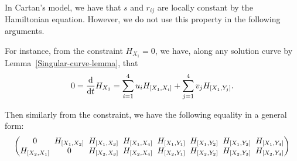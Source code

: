 \documentclass[11pt]{article}
\numberwithin{equation}{section}
\numberwithin{equation}{section}
\theoremstyle{definition}
\newcommand{\0}{\boldsymbol{0}}
\begin{document}
\begin{Remark}
In Cartan's model, we have that $s$ and $r_{ij}$ are locally constant by the Hamiltonian equation.
However, we do not use this property in the following arguments.
\end{Remark}

For instance, from the constraint $H_{X_1} = 0$, we have, along any solution curve
by Lemma~\ref{Singular-curve-lemma}, that
\[
0 = \frac{{\rm d}}{{\rm d}t}H_{X_1} = \sum_{i=1}^4 u_iH_{[X_1, X_i]} + \sum_{j=1}^4 v_jH_{[X_1, Y_j]}.
\]

Then similarly from the constraint, we have the following equality in a general form:
\begin{gather*}
\begin{pmatrix}
0 \hspace{-2.3pt}&\hspace{-2.3pt} H_{[X_1, X_2]} \hspace{-2.3pt}&\hspace{-2.3pt} H_{[X_1, X_3]} \hspace{-2.3pt}&\hspace{-2.3pt} H_{[X_1, X_4]} \hspace{-2.3pt}&\hspace{-2.3pt} H_{[X_1, Y_1]} \hspace{-2.3pt}&\hspace{-2.3pt} H_{[X_1, Y_2]} \hspace{-2.3pt}&\hspace{-2.3pt} H_{[X_1, Y_3]} \hspace{-2.3pt}&\hspace{-2.3pt}
H_{[X_1, Y_4]}
\\
H_{[X_2, X_1]} \hspace{-2.3pt}&\hspace{-2.3pt} 0 \hspace{-2.3pt}&\hspace{-2.3pt} H_{[X_2, X_3]} \hspace{-2.3pt}&\hspace{-2.3pt} H_{[X_2, X_4]} \hspace{-2.3pt}&\hspace{-2.3pt} H_{[X_2, Y_1]} \hspace{-2.3pt}&\hspace{-2.3pt} H_{[X_2, Y_2]} \hspace{-2.3pt}&\hspace{-2.3pt} H_{[X_2, Y_3]} \hspace{-2.3pt}&\hspace{-2.3pt}
H_{[X_2, Y_4]}

\end{pmatrix}
\end{gather*}
\end{document}
